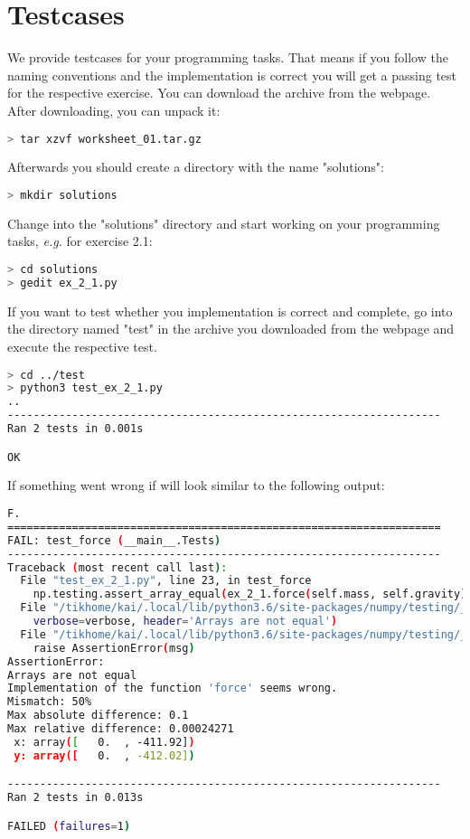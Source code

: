 \section*{Testcases}
We provide testcases for your programming tasks. That means if you follow the naming conventions
and the implementation is correct you will get a passing test for the respective exercise. You can download
the archive from the webpage. After downloading, you can unpack it:
\begin{lstlisting}[language=bash]
> tar xzvf worksheet_01.tar.gz
\end{lstlisting}
Afterwards you should create a directory  with the name "solutions":
\begin{lstlisting}[language=bash]
> mkdir solutions
\end{lstlisting}
Change into the "solutions" directory and start working on your programming tasks, \textit{e.g.} for exercise 2.1:
\begin{lstlisting}[language=bash]
> cd solutions
> gedit ex_2_1.py
\end{lstlisting}
If you want to test whether you implementation is correct and complete, go into the directory named "test"
in the archive you downloaded from the webpage and execute the respective test.
\begin{lstlisting}[language=bash]
> cd ../test
> python3 test_ex_2_1.py
..
-------------------------------------------------------------------
Ran 2 tests in 0.001s

OK
\end{lstlisting}
If something went wrong if will look similar to the following output:
\begin{lstlisting}[language=bash]
F.
===================================================================
FAIL: test_force (__main__.Tests)
-------------------------------------------------------------------
Traceback (most recent call last):
  File "test_ex_2_1.py", line 23, in test_force
    np.testing.assert_array_equal(ex_2_1.force(self.mass, self.gravity), self.f)
  File "/tikhome/kai/.local/lib/python3.6/site-packages/numpy/testing/_private/utils.py", line 918, in assert_array_equal
    verbose=verbose, header='Arrays are not equal')
  File "/tikhome/kai/.local/lib/python3.6/site-packages/numpy/testing/_private/utils.py", line 841, in assert_array_compare
    raise AssertionError(msg)
AssertionError:
Arrays are not equal
Implementation of the function 'force' seems wrong.
Mismatch: 50%
Max absolute difference: 0.1
Max relative difference: 0.00024271
 x: array([   0.  , -411.92])
 y: array([   0.  , -412.02])

-------------------------------------------------------------------
Ran 2 tests in 0.013s

FAILED (failures=1)
\end{lstlisting}

